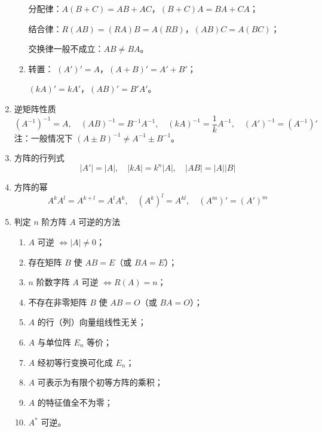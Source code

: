 \documentclass[UTF8]{ctexart}
\theoremstyle{remark}
\begin{document}
\begin{enumerate}
\begin{enumerate}
分配律：\(A(B + C) = AB + AC\)，\((B + C)A = BA + CA\)；  
		
结合律：\(R(AB) = (RA)B = A(RB)\)，\((AB)C = A(BC)\)；  
		
交换律一般不成立：\(AB \neq BA\)。  
		\item 转置：  
\((A')' = A\)，\((A + B)' = A' + B'\)；  
		
\((kA)' = kA'\)，\((AB)' = B'A'\)。  
	\end{enumerate}


\item 逆矩阵性质  
\[
\left(A^{-1}\right)^{-1} = A, \quad (AB)^{-1} = B^{-1}A^{-1}, \quad (kA)^{-1} = \frac{1}{k}A^{-1}, \quad \left(A'\right)^{-1} = \left(A^{-1}\right)'
\]  
注：一般情况下 \((A \pm B)^{-1} \neq A^{-1} \pm B^{-1}\)。  

\item 方阵的行列式  
\[
\left|A'\right| = |A|, \quad |kA| = k^n|A|, \quad |AB| = |A||B|
\]  

\item 方阵的幂  
\[
A^kA^l = A^{k+l} = A^lA^k, \quad \left(A^k\right)^l = A^{kl}, \quad \left(A^m\right)' = \left(A'\right)^m
\]  

\item 判定 \(n\) 阶方阵 \(A\) 可逆的方法  
\begin{enumerate}
	\item \(A\) 可逆 \(\Leftrightarrow |A| \neq 0\)；  
	\item 存在矩阵 \(B\) 使 \(AB = E\)（或 \(BA = E\)）；  
	\item \(n\) 阶数字阵 \(A\) 可逆 \(\Leftrightarrow R(A) = n\)；  
	\item 不存在非零矩阵 \(B\) 使 \(AB = O\)（或 \(BA = O\)）；  
	\item \(A\) 的行（列）向量组线性无关；  
	\item \(A\) 与单位阵 \(E_n\) 等价；  
	\item \(A\) 经初等行变换可化成 \(E_n\)；  
	\item \(A\) 可表示为有限个初等方阵的乘积；  
	\item \(A\) 的特征值全不为零；  
	\item \(A^*\) 可逆。  
\end{enumerate}  


\end{enumerate}
\end{document}
